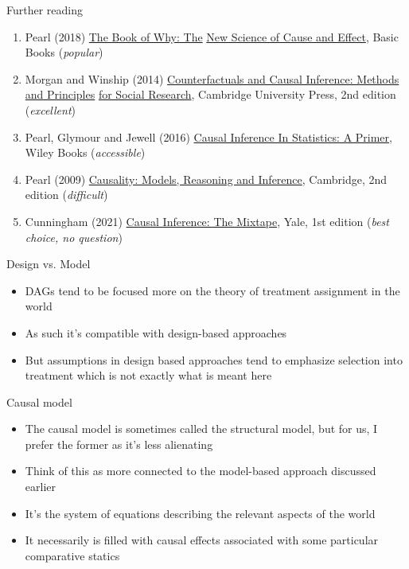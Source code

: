 \documentclass{beamer}
\begin{document}
\begin{frame}{Further reading}

  \begin{enumerate}

    \item Pearl (2018) \underline{The Book of Why: The} \underline{New Science of Cause and Effect}, Basic Books (\emph{popular})
    \item Morgan and Winship (2014) \underline{Counterfactuals and Causal Inference: Methods and Principles} \underline{for Social Research}, Cambridge University Press, 2nd edition (\emph{excellent})
    \item Pearl, Glymour and Jewell (2016) \underline{Causal Inference In Statistics: A Primer}, Wiley Books (\emph{accessible})
    \item Pearl (2009) \underline{Causality: Models, Reasoning and Inference}, Cambridge, 2nd edition (\emph{difficult})
    \item Cunningham (2021) \underline{Causal Inference: The Mixtape}, Yale, 1st edition (\emph{best choice, no question})
  \end{enumerate}

\end{frame}

\begin{frame}{Design vs. Model}

  \begin{itemize}
    \item DAGs tend to be focused more on the theory of treatment assignment in the world
    \item As such it's compatible with design-based approaches
    \item But assumptions in design based approaches tend to emphasize selection into treatment which is not exactly what is meant here
  \end{itemize}

\end{frame}

\begin{frame}{Causal model}

  \begin{itemize}
    \item The causal model is sometimes called the structural model, but for us, I prefer the former as it's less alienating
    \item Think of this as more connected to the model-based approach discussed earlier
    \item It's the system of equations describing the relevant aspects of the world
    \item It necessarily is filled with causal effects associated with some particular comparative statics
  \end{itemize}

\end{frame}
\end{document}
